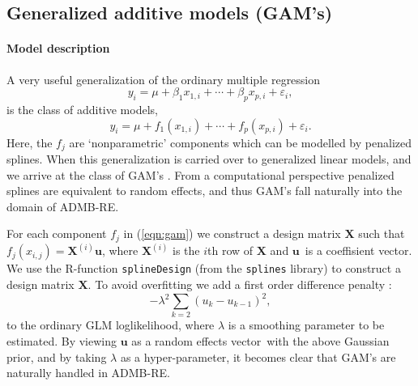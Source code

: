 \documentclass[12pt,letter,reqno]{book}
\begin{document}
\newpage

\subsection{Generalized additive models (GAM's)}
\label{sec:gam}

\paragraph{Model description}
A very useful generalization of the
ordinary multiple regression 
\[
y_{i}=\mu +\beta _{1}x_{1,i}+\cdots +\beta _{p}x_{p,i}+\varepsilon _{i},
\]%
is the class of additive models, 
\begin{equation}
y_{i}=\mu +f_{1}(x_{1,i})+\cdots +f_{p}(x_{p,i})+\varepsilon _{i}.
\label{eqn:gam}
\end{equation}%
Here, the $f_{j}$ are `nonparametric' components which can be
modelled by penalized splines. When this generalization is carried over to
generalized linear models, and we arrive at the class of GAM's \cite%
{hast:tibs:1990}. From a computational perspective penalized splines are
equivalent to random effects, and thus GAM's fall naturally into the domain
of ADMB-RE.

For each component $f_{j}$ in (\ref{eqn:gam}) we construct a design matrix $%
\mathbf{X}$ such that $f_{j}(x_{i,j})=\mathbf{X}^{(i)}\mathbf{u}$, where $%
\mathbf{X}^{(i)}$ is the $i$th row of $\mathbf{X}$ and $\mathbf{u}$\ is a
coeffisient vector. We use the R-function \texttt{splineDesign} (from the 
\texttt{splines} library) to construct a design matrix $\mathbf{X}$. To
avoid overfitting we add a first order difference penalty%
 \cite{eile:marx:1996} :%
\begin{equation}
-\lambda ^{2}\sum_{k=2}\left( u_{k}-u_{k-1}\right) ^{2},
\label{eqn:first_order}
\end{equation}%
to the ordinary GLM loglikelihood, where $\lambda $ is a smoothing parameter
to be estimated. By viewing $\mathbf{u}$ as a random effects vector\ with
the above Gaussian prior, and by taking $\lambda $ as a hyper-parameter, it
becomes clear that GAM's are naturally handled in ADMB-RE.
\end{document}
